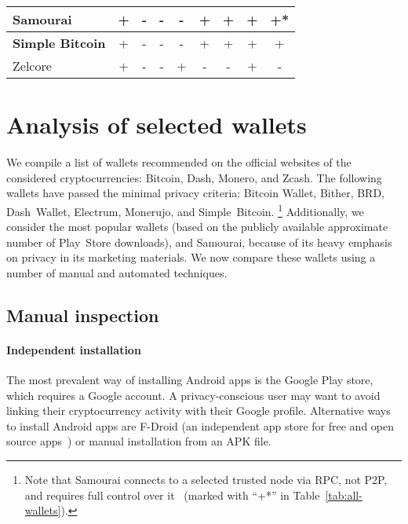 \begin{table*}
\begin{tabular}{ | l | c c c c | c | c | c | c | }
		\hline
		Samourai & + & - & - & - & + & + & + & +* \\
		\hline
		\textbf{Simple Bitcoin} & + & - & - & - & + & + & + & + \\
		\hline
		Zelcore & + & - & - & + & - & - & + & - \\
		\hline
	\end{tabular}
	\label{tab:minimal-criteria}
\end{table*}


\section{Analysis of selected wallets} \label{section:Ch04Analysis}

We compile a list of wallets recommended on the official websites of the
considered cryptocurrencies: Bitcoin, Dash, Monero, and Zcash.
The following wallets have passed the minimal privacy criteria: Bitcoin Wallet, Bither, BRD, Dash~Wallet, Electrum, Monerujo, and Simple~Bitcoin.
\footnote{Note that Samourai connects to a selected trusted node via RPC, not P2P, and requires full control over it~\cite{SamouraiRPC} (marked with “+*” in Table~\ref{tab:all-wallets}).}
Additionally, we consider the most popular wallets (based on the publicly available approximate number of Play~Store downloads), and Samourai, because of its heavy emphasis on privacy in its marketing materials.
We now compare these wallets using a number of manual and automated techniques.


\subsection{Manual inspection}

\paragraph{Independent installation}
The most prevalent way of installing Android apps is the Google Play store, which requires a Google account.
A privacy-conscious user may want to avoid linking their cryptocurrency activity with their Google profile.
Alternative ways to install Android apps are F-Droid (an independent app store for free and open source apps~\cite{FDroid}) or manual installation from an APK file.

